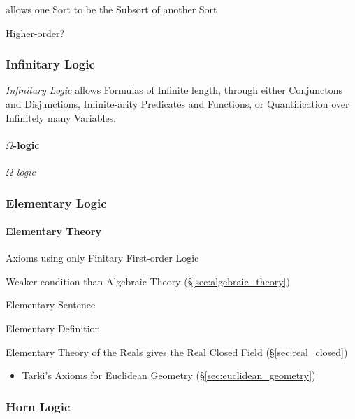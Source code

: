 allows one Sort to be the Subsort of another Sort

Higher-order?



\subsubsection{Infinitary Logic}\label{sec:infinitary_logic}

\emph{Infinitary Logic} allows Formulas of Infinite length, through
either Conjunctons and Disjunctions, Infinite-arity Predicates and
Functions, or Quantification over Infinitely many Variables.



\paragraph{$\Omega$-logic}\label{sec:omega_logic}\hfill

\emph{$\Omega$-logic}



\subsubsection{Elementary Logic}\label{sec:elementary_logic}

\paragraph{Elementary Theory}\label{sec:elementary_theory}\hfill

Axioms using only Finitary First-order Logic %

Weaker condition than Algebraic Theory (\S\ref{sec:algebraic_theory})

Elementary Sentence

Elementary Definition

Elementary Theory of the Reals gives the Real Closed Field
(\S\ref{sec:real_closed})

\begin{itemize}
  \item Tarki's Axioms for Euclidean Geometry (\S\ref{sec:euclidean_geometry})
\end{itemize}



\subsubsection{Horn Logic}\label{sec:horn_logic}

